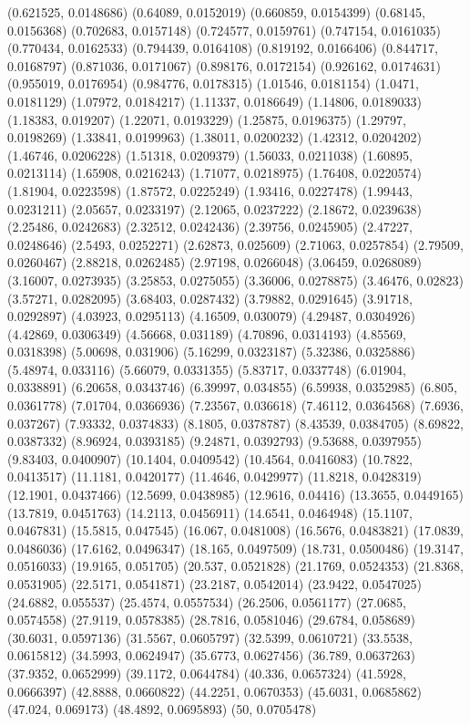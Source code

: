 {(0.621525, 0.0148686)
(0.64089, 0.0152019)
(0.660859, 0.0154399)
(0.68145, 0.0156368)
(0.702683, 0.0157148)
(0.724577, 0.0159761)
(0.747154, 0.0161035)
(0.770434, 0.0162533)
(0.794439, 0.0164108)
(0.819192, 0.0166406)
(0.844717, 0.0168797)
(0.871036, 0.0171067)
(0.898176, 0.0172154)
(0.926162, 0.0174631)
(0.955019, 0.0176954)
(0.984776, 0.0178315)
(1.01546, 0.0181154)
(1.0471, 0.0181129)
(1.07972, 0.0184217)
(1.11337, 0.0186649)
(1.14806, 0.0189033)
(1.18383, 0.019207)
(1.22071, 0.0193229)
(1.25875, 0.0196375)
(1.29797, 0.0198269)
(1.33841, 0.0199963)
(1.38011, 0.0200232)
(1.42312, 0.0204202)
(1.46746, 0.0206228)
(1.51318, 0.0209379)
(1.56033, 0.0211038)
(1.60895, 0.0213114)
(1.65908, 0.0216243)
(1.71077, 0.0218975)
(1.76408, 0.0220574)
(1.81904, 0.0223598)
(1.87572, 0.0225249)
(1.93416, 0.0227478)
(1.99443, 0.0231211)
(2.05657, 0.0233197)
(2.12065, 0.0237222)
(2.18672, 0.0239638)
(2.25486, 0.0242683)
(2.32512, 0.0242436)
(2.39756, 0.0245905)
(2.47227, 0.0248646)
(2.5493, 0.0252271)
(2.62873, 0.025609)
(2.71063, 0.0257854)
(2.79509, 0.0260467)
(2.88218, 0.0262485)
(2.97198, 0.0266048)
(3.06459, 0.0268089)
(3.16007, 0.0273935)
(3.25853, 0.0275055)
(3.36006, 0.0278875)
(3.46476, 0.02823)
(3.57271, 0.0282095)
(3.68403, 0.0287432)
(3.79882, 0.0291645)
(3.91718, 0.0292897)
(4.03923, 0.0295113)
(4.16509, 0.030079)
(4.29487, 0.0304926)
(4.42869, 0.0306349)
(4.56668, 0.031189)
(4.70896, 0.0314193)
(4.85569, 0.0318398)
(5.00698, 0.031906)
(5.16299, 0.0323187)
(5.32386, 0.0325886)
(5.48974, 0.033116)
(5.66079, 0.0331355)
(5.83717, 0.0337748)
(6.01904, 0.0338891)
(6.20658, 0.0343746)
(6.39997, 0.034855)
(6.59938, 0.0352985)
(6.805, 0.0361778)
(7.01704, 0.0366936)
(7.23567, 0.036618)
(7.46112, 0.0364568)
(7.6936, 0.037267)
(7.93332, 0.0374833)
(8.1805, 0.0378787)
(8.43539, 0.0384705)
(8.69822, 0.0387332)
(8.96924, 0.0393185)
(9.24871, 0.0392793)
(9.53688, 0.0397955)
(9.83403, 0.0400907)
(10.1404, 0.0409542)
(10.4564, 0.0416083)
(10.7822, 0.0413517)
(11.1181, 0.0420177)
(11.4646, 0.0429977)
(11.8218, 0.0428319)
(12.1901, 0.0437466)
(12.5699, 0.0438985)
(12.9616, 0.04416)
(13.3655, 0.0449165)
(13.7819, 0.0451763)
(14.2113, 0.0456911)
(14.6541, 0.0464948)
(15.1107, 0.0467831)
(15.5815, 0.047545)
(16.067, 0.0481008)
(16.5676, 0.0483821)
(17.0839, 0.0486036)
(17.6162, 0.0496347)
(18.165, 0.0497509)
(18.731, 0.0500486)
(19.3147, 0.0516033)
(19.9165, 0.051705)
(20.537, 0.0521828)
(21.1769, 0.0524353)
(21.8368, 0.0531905)
(22.5171, 0.0541871)
(23.2187, 0.0542014)
(23.9422, 0.0547025)
(24.6882, 0.055537)
(25.4574, 0.0557534)
(26.2506, 0.0561177)
(27.0685, 0.0574558)
(27.9119, 0.0578385)
(28.7816, 0.0581046)
(29.6784, 0.058689)
(30.6031, 0.0597136)
(31.5567, 0.0605797)
(32.5399, 0.0610721)
(33.5538, 0.0615812)
(34.5993, 0.0624947)
(35.6773, 0.0627456)
(36.789, 0.0637263)
(37.9352, 0.0652999)
(39.1172, 0.0644784)
(40.336, 0.0657324)
(41.5928, 0.0666397)
(42.8888, 0.0660822)
(44.2251, 0.0670353)
(45.6031, 0.0685862)
(47.024, 0.069173)
(48.4892, 0.0695893)
(50, 0.0705478)
}

